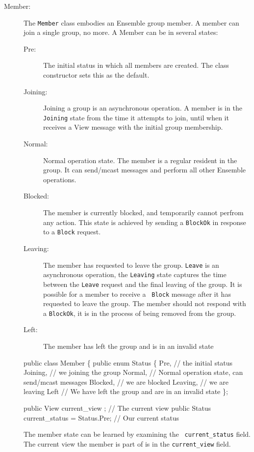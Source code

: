 \begin{description}
\item[Member:] The {\tt Member} class embodies an Ensemble group
  member. A member can join a single group, no more. A Member can be in several states: 
  \begin{description}
    \item[Pre:] The initial status in which all members are
      created. The class constructor sets this as the default.
    \item[Joining:] Joining a group is an asynchronous operation. A
      member is in the {\tt Joining} state from the time it attempts to join,
      until when it receives a View message with the initial group
      membership. 
    \item[Normal:] Normal operation state. The member is a regular
      resident in the group. It can send/mcast messages and
      perform all other Ensemble operations. 
    \item[Blocked:] The member is currently blocked, and temporarily cannot 
      perfrom any action. This state is achieved by sending a {\tt BlockOk}
      in response to a {\tt Block} request. 
    \item[Leaving:] The member has requested to leave the group. {\tt Leave}
      is an asynchronous operation, the {\tt Leaving} state captures
      the time between the {\tt Leave} request and the final leaving
      of the group. It is possible for a member to receive a {\tt
      Block} message after it has requested to leave the group. The
      member should not respond with a {\tt BlockOk}, it is in the
      process of being removed from the group. 
    \item[Left:] The member has left the group and is in an invalid state
  \end{description}

  \begin{codebox}
  public class Member \{
      public enum Status \{
          Pre,        // the initial status
          Joining,    // we joining the group
          Normal,     // Normal operation state, can send/mcast messages
          Blocked,    // we are blocked
          Leaving,    // we are leaving
          Left        // We have left the group and are in an invalid state
      \};

      public View current\_view ;		       // The current view
      public Status current\_status = Status.Pre; // Our current status
  \end{codebox}

  The member state can be learned by examining the {\tt
  current\_status} field. The current view the member is part of is in 
  the {\tt current\_view} field. 


\end{description}
